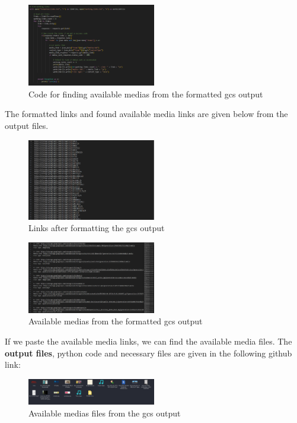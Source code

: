 \documentclass[12 pt]{article}
\begin{document}
\begin{figure}[H]
    \centering
    \includegraphics[width=0.5\textwidth]{gcs_Success_Links_Finding_Code.png}
    \caption{Code for finding available medias from the formatted gcs output}
    \label{fig: gcs Success Links Finding Code}
\end{figure}
The formatted links and found available media links are given below from the output files.
\begin{figure}[H]
    \centering
    \includegraphics[width=0.5\textwidth]{gcs_Output_Formatted_Links.png}
    \caption{Links after formatting the gcs output}
    \label{fig: gcs Output Formatted Links}
\end{figure}

\begin{figure}[H]
    \centering
    \includegraphics[width=0.5\textwidth]{gcs_Success_Links.png}
    \caption{Available medias from the formatted gcs output}
    \label{fig: gcs Success Links}
\end{figure}
If we paste the available media links, we can find the available media files. The \textbf{output files}, python code and necessary files are given in the following github link: \cite{github_output}
\begin{figure}[H]
    \centering
    \includegraphics[width=0.5\textwidth]{gcs_Output_Files.png}
    \caption{Available medias files from the gcs output}
    \label{fig: gcs Output Files}
\end{figure}
\end{document}
